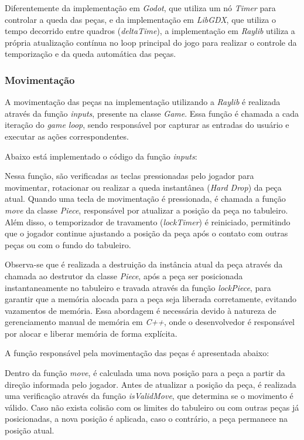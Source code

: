 Diferentemente da implementação em \textit{Godot}, que utiliza um nó \textit{Timer} para controlar a queda das peças, e da implementação em \textit{LibGDX}, que utiliza o tempo decorrido entre quadros (\textit{deltaTime}), a implementação em \textit{Raylib} utiliza a própria atualização contínua no loop principal do jogo para realizar o controle da temporização e da queda automática das peças.

\subsubsection{Movimentação}

A movimentação das peças na implementação utilizando a \textit{Raylib} é realizada através da função \textit{inputs}, presente na classe \textit{Game}. Essa função é chamada a cada iteração do \textit{game loop}, sendo responsável por capturar as entradas do usuário e executar as ações correspondentes. 

Abaixo está implementado o código da função \textit{inputs}:


Nessa função, são verificadas as teclas pressionadas pelo jogador para movimentar, rotacionar ou realizar a queda instantânea (\textit{Hard Drop}) da peça atual. Quando uma tecla de movimentação é pressionada, é chamada a função \textit{move} da classe \textit{Piece}, responsável por atualizar a posição da peça no tabuleiro. Além disso, o temporizador de travamento (\textit{lockTimer}) é reiniciado, permitindo que o jogador continue ajustando a posição da peça após o contato com outras peças ou com o fundo do tabuleiro.

Observa-se que é realizada a destruição da instância atual da peça através da chamada ao destrutor da classe \textit{Piece}, após a peça ser posicionada instantaneamente no tabuleiro e travada através da função \textit{lockPiece}, para garantir que a memória alocada para a peça seja liberada corretamente, evitando vazamentos de memória. Essa abordagem é necessária devido à natureza de gerenciamento manual de memória em \textit{C++}, onde o desenvolvedor é responsável por alocar e liberar memória de forma explícita.

A função responsável pela movimentação das peças é apresentada abaixo:



Dentro da função \textit{move}, é calculada uma nova posição para a peça a partir da direção informada pelo jogador. Antes de atualizar a posição da peça, é realizada uma verificação através da função \textit{isValidMove}, que determina se o movimento é válido. Caso não exista colisão com os limites do tabuleiro ou com outras peças já posicionadas, a nova posição é aplicada, caso o contrário, a peça permanece na posição atual.

